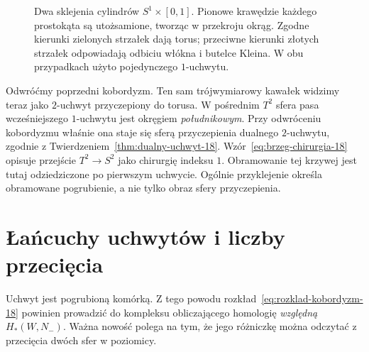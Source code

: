\begin{figure}[htbp]
\centering
{}
\caption{Dwa sklejenia cylindrów $S^1\times[0,1]$.
Pionowe krawędzie każdego prostokąta są utożsamione,
tworząc w przekroju okrąg. Zgodne kierunki zielonych
strzałek dają torus; przeciwne kierunki złotych
strzałek odpowiadają odbiciu włókna i butelce Kleina.
W obu przypadkach użyto pojedynczego $1$-uchwytu.}
\label{fig:skrecony-uchwyt-klein-24}
\end{figure}

\begin{przyklad}
Odwróćmy poprzedni kobordyzm. Ten sam
trójwymiarowy kawałek widzimy teraz jako
$2$-uchwyt przyczepiony do torusa.
W pośrednim $T^2$ sfera pasa wcześniejszego
$1$-uchwytu jest okręgiem \emph{południkowym}.
Przy odwróceniu kobordyzmu właśnie ona staje się
sferą przyczepienia dualnego $2$-uchwytu,
zgodnie z Twierdzeniem~\ref{thm:dualny-uchwyt-18}.
Wzór~\eqref{eq:brzeg-chirurgia-18}
opisuje przejście $T^2\to S^2$ jako
chirurgię indeksu $1$. Obramowanie tej
krzywej jest tutaj odziedziczone po pierwszym uchwycie.
Ogólnie przyklejenie określa obramowane pogrubienie,
a nie tylko obraz sfery przyczepienia.
\end{przyklad}

\section{Łańcuchy uchwytów i liczby przecięcia}
\label{sec:lancuchy-uchwytow-18}

Uchwyt jest pogrubioną komórką. Z tego powodu
rozkład~\eqref{eq:rozklad-kobordyzm-18} powinien
prowadzić do kompleksu obliczającego homologię
\emph{względną} $H_*(W,N_-)$. Ważna nowość
polega na tym, że jego różniczkę można odczytać
z przecięcia dwóch sfer w poziomicy.

